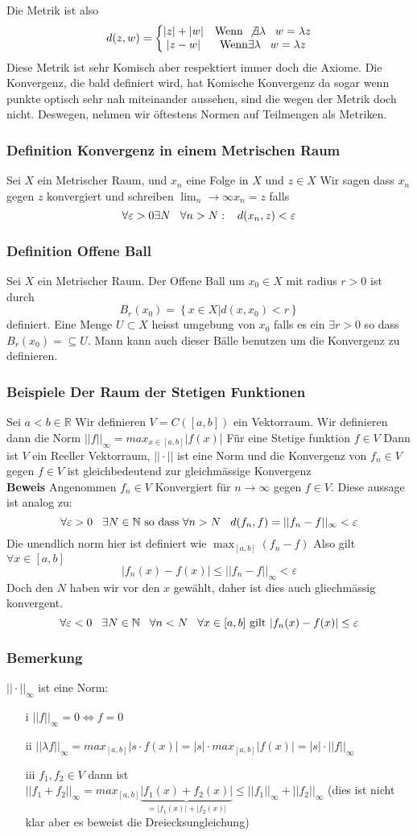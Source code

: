 \documentclass{article}
\newcommand{\smspc}{\hspace{0.3cm}}
\newcommand{\beweis}{\\\textbf{Beweis }}
\newcommand{\beispiel}[1]{\subsubsection*{Beispiele {#1}}}
\newcommand{\bemerkung}[1]{\subsubsection*{Bemerkung {#1}}}
\newcommand{\definition}[1]{\subsubsection*{Definition {#1}}}
\begin{document}
Die Metrik ist also \[d(z,w)=\left\lbrace\begin{matrix}|z|+|w|&\text{Wenn }\not\exists \lambda\smspc w=\lambda z\\|z-w|&\text{Wenn} \exists \lambda \smspc w=\lambda z\end{matrix}\right.\]
Diese Metrik ist sehr Komisch aber respektiert immer doch die Axiome. Die Konvergenz, die bald definiert wird, hat Komische Konvergenz da sogar wenn punkte optisch sehr nah miteinander aussehen, sind die wegen der Metrik doch nicht. Deswegen, nehmen wir öftestens Normen auf Teilmengen als Metriken.
\definition{Konvergenz in einem Metrischen Raum} Sei $X$ ein Metrischer Raum, und $x_n$ eine Folge in $X$ und $z\in X$ Wir sagen dass $x_n$ gegen $z$ konvergiert und schreiben $\lim_n\rightarrow\infty x_n=z$ falls \[\forall \varepsilon>0 \exists N\smspc \forall n>N: \smspc d(x_n,z)<\varepsilon\]
\definition{Offene Ball} Sei $X$ ein Metrischer Raum. Der Offene Ball um $x_0\in X$ mit radius $r>0$ ist durch \[B_r(x_0)=\left\lbrace \left. x\in X\right|d(x,x_0)<r\right\rbrace\] definiert. Eine Menge $U\subset X$ heisst umgebung von $x_0$ falls es ein $\exists r>0$ so dass $B_r(x_0)=\subseteq U$. Mann kann auch dieser Bälle benutzen um die Konvergenz zu definieren. 
\beispiel{Der Raum der Stetigen Funktionen} Sei $a<b\in\mathbb{R}$ Wir definieren $V=C([a,b])$ ein Vektorraum. Wir definieren dann die Norm $||f||_\infty=max_{x\in[a,b]}|f(x)|$ Für eine Stetige funktion $f\in V$ Dann ist $V$ ein Reeller Vektorraum, $||\cdot||$ ist eine Norm und die Konvergenz von $f_n\in V$ gegen $f\in V$ ist gleichbedeutend zur gleichmässige Konvergenz 
\beweis Angenommen $f_n\in V$ Konvergiert für $n\rightarrow \infty$ gegen $f \in V$. Diese aussage ist analog zu:
\[\forall \varepsilon >0\smspc \exists N\in \mathbb{N} \text{ so dass } \forall n>N \smspc d(f_n,f)=||f_n-f||_\infty<\varepsilon\]
Die unendlich norm hier ist definiert wie $\max_{[a,b]}(f_n-f)$ Also gilt $\forall x\in [a,b]$\[|f_n(x)-f(x)|\le||f_n-f||_\infty<\varepsilon\] Doch den $N$ haben wir vor den $x$ gewählt, daher ist dies auch gliechmässig konvergent.
\[\forall \varepsilon< 0\smspc \exists N\in \mathbb{N}\smspc \forall n< N\smspc\forall x\in[a,b]\text{ gilt } |f_n(x)-f(x)|\le\varepsilon\]
\bemerkung{} $||\cdot||_\infty$ ist eine Norm:
\begin{itemize}
  \item[i]{$||f||_\infty=0\Longleftrightarrow f=0$}
  \item[ii]{$||\lambda f||_\infty=max_{[a,b]}|s\cdot f(x)|=|s|\cdot max_{[a,b]}|f(x)|=|s|\cdot||f||_\infty$}
  \item[iii]{$f_1,f_2\in V$ dann ist $||f_1+f_2||_\infty=max_{[a,b]}\underset{=|f_1(x)|+|f_2(x)|}{\underbrace{|f_1(x)+f_2(x)|}}\le||f_1||_\infty+||f_2||_\infty$ (dies ist nicht klar aber es beweist die Dreiecksungleichung)}
\end{itemize}
\end{document}
